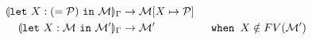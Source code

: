 \begin{align*}
  \Osubst{\E}{\ix : \Salias{\iP}}{\iM}
  &\to \subst{\ix}{\iP}{\iM}\\
  \Osubst{\E}{\ix : \iM}{\iM'}
  &\to \iM' &\texttt{ when } \ix\notin FV(\iM')
\end{align*}

